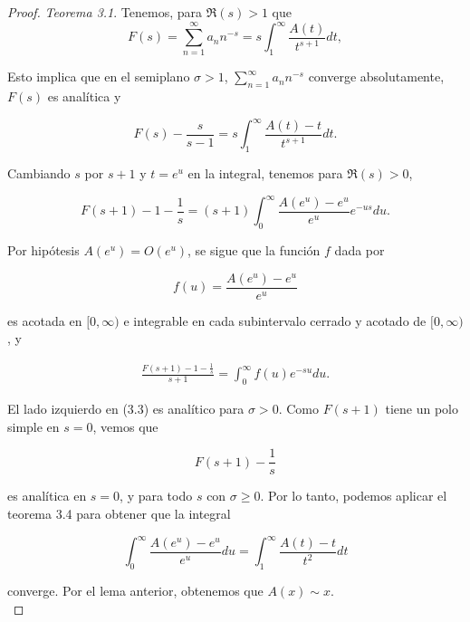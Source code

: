 \begin{proof}\textit{ Teorema 3.1}. Tenemos, para $\Re(s)>1$ que
\[
F(s)=\sum_{n=1}^{\infty}a_nn^{-s} =s \int_1^{\infty}\frac{A(t)}{t^{s+1}} d t,
\]

Esto implica que en el semiplano \( \sigma > 1 \), \(\displaystyle \sum_{n=1}^{\infty} a_n n^{-s} \) converge absolutamente, \( F(s) \) es analítica y  

\[
F(s) - \frac{s}{s-1} = s \int_1^{\infty} \frac{A(t)-t}{t^{s+1}} d t.
\]

Cambiando \( s \) por \( s+1 \) y \( t = e^u \) en la integral, tenemos para \( \Re(s) > 0 \),  

\[
F(s+1) - 1 - \frac{1}{s} = (s+1) \int_0^{\infty} \frac{A\left(e^u\right) - e^u}{e^u} e^{-u s} d u.
\]

Por hipótesis \( A\left(e^u\right) = O\left(e^u\right) \), se sigue que la función \( f \) dada por  

\[
f(u) = \frac{A\left(e^u\right) - e^u}{e^u}
\]

es acotada en \( [0, \infty) \) e integrable en cada subintervalo cerrado y acotado de \( [0, \infty) \), y  

\begin{align}
    \frac{F(s+1) - 1 - \frac{1}{s}}{s+1} = \int_0^{\infty} f(u) e^{-s u} d u.
\end{align}

El lado izquierdo en (3.3) es analítico para \( \sigma > 0 \). Como \( F(s+1) \) tiene un polo simple en \( s = 0 \), vemos que

 \[ F(s+1) - \dfrac{1}{s}\]

 es analítica en \( s = 0 \), y para todo \( s \) con \( \sigma \geq 0 \). Por lo tanto, podemos aplicar el teorema 3.4 para obtener que la integral  

\[
\int_0^{\infty} \frac{A\left(e^u\right) - e^u}{e^u} d u = \int_1^{\infty} \frac{A(t)-t}{t^2} d t
\]

converge. Por el lema anterior, obtenemos que \( A(x) \sim x \).\\
\end{proof}

